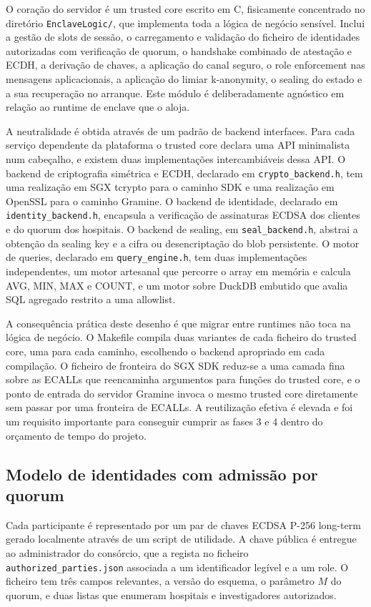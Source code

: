 O coração do servidor é um trusted core escrito em C, fisicamente concentrado no diretório \texttt{EnclaveLogic/}, que implementa toda a lógica de negócio sensível. Inclui a gestão de slots de sessão, o carregamento e validação do ficheiro de identidades autorizadas com verificação de quorum, o handshake combinado de atestação e ECDH, a derivação de chaves, a aplicação do canal seguro, o role enforcement nas mensagens aplicacionais, a aplicação do limiar k-anonymity, o sealing do estado e a sua recuperação no arranque. Este módulo é deliberadamente agnóstico em relação ao runtime de enclave que o aloja.

A neutralidade é obtida através de um padrão de backend interfaces. Para cada serviço dependente da plataforma o trusted core declara uma API minimalista num cabeçalho, e existem duas implementações intercambiáveis dessa API. O backend de criptografia simétrica e ECDH, declarado em \texttt{crypto\_backend.h}, tem uma realização em SGX tcrypto para o caminho SDK e uma realização em OpenSSL para o caminho Gramine. O backend de identidade, declarado em \texttt{identity\_backend.h}, encapsula a verificação de assinaturas ECDSA dos clientes e do quorum dos hospitais. O backend de sealing, em \texttt{seal\_backend.h}, abstrai a obtenção da sealing key e a cifra ou desencriptação do blob persistente. O motor de queries, declarado em \texttt{query\_engine.h}, tem duas implementações independentes, um motor artesanal que percorre o array em memória e calcula AVG, MIN, MAX e COUNT, e um motor sobre DuckDB embutido que avalia SQL agregado restrito a uma allowlist.

A consequência prática deste desenho é que migrar entre runtimes não toca na lógica de negócio. O Makefile compila duas variantes de cada ficheiro do trusted core, uma para cada caminho, escolhendo o backend apropriado em cada compilação. O ficheiro de fronteira do SGX SDK reduz-se a uma camada fina sobre as ECALLs que reencaminha argumentos para funções do trusted core, e o ponto de entrada do servidor Gramine invoca o mesmo trusted core diretamente sem passar por uma fronteira de ECALLs. A reutilização efetiva é elevada e foi um requisito importante para conseguir cumprir as fases 3 e 4 dentro do orçamento de tempo do projeto.

\subsection{Modelo de identidades com admissão por quorum}

Cada participante é representado por um par de chaves ECDSA P-256 long-term gerado localmente através de um script de utilidade. A chave pública é entregue ao administrador do consórcio, que a regista no ficheiro \texttt{authorized\_parties.json} associada a um identificador legível e a um role. O ficheiro tem três campos relevantes, a versão do esquema, o parâmetro $M$ do quorum, e duas listas que enumeram hospitais e investigadores autorizados.

